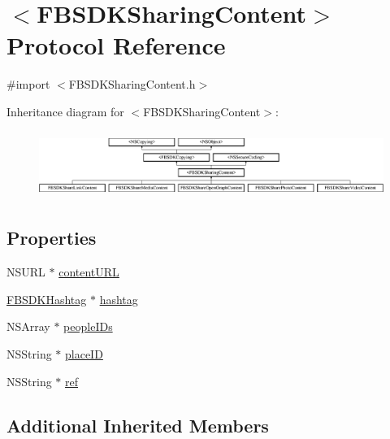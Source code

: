 \hypertarget{protocol_f_b_s_d_k_sharing_content-p}{}\section{$<$F\+B\+S\+D\+K\+Sharing\+Content$>$ Protocol Reference}
\label{protocol_f_b_s_d_k_sharing_content-p}


{\ttfamily \#import $<$F\+B\+S\+D\+K\+Sharing\+Content.\+h$>$}

Inheritance diagram for $<$F\+B\+S\+D\+K\+Sharing\+Content$>$\+:\begin{figure}[H]
\begin{center}
\leavevmode
\includegraphics[height=2.196079cm]{protocol_f_b_s_d_k_sharing_content-p}
\end{center}
\end{figure}
\subsection*{Properties}
\begin{DoxyCompactItemize}
\item 
N\+S\+U\+R\+L $\ast$ \hyperlink{protocol_f_b_s_d_k_sharing_content-p_af1a334ad35323e1f865fd46b6c30f0c8}{content\+U\+R\+L}
\item 
\hyperlink{interface_f_b_s_d_k_hashtag}{F\+B\+S\+D\+K\+Hashtag} $\ast$ \hyperlink{protocol_f_b_s_d_k_sharing_content-p_ac94d818680e7a36895593c377d4fb6a1}{hashtag}
\item 
N\+S\+Array $\ast$ \hyperlink{protocol_f_b_s_d_k_sharing_content-p_a07031f755deb87e88a8c0765c9d6651d}{people\+I\+Ds}
\item 
N\+S\+String $\ast$ \hyperlink{protocol_f_b_s_d_k_sharing_content-p_a8af542b311e24d38c73221d81d250399}{place\+I\+D}
\item 
N\+S\+String $\ast$ \hyperlink{protocol_f_b_s_d_k_sharing_content-p_a5ea294c3c5b2fd923d00ea95fc19a20d}{ref}
\end{DoxyCompactItemize}
\subsection*{Additional Inherited Members}


